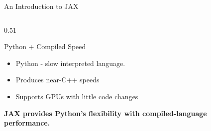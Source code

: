 \documentclass{beamer}
\begin{document}
\begin{frame}{An Introduction to JAX}
\begin{columns}[T,totalwidth=\textwidth]
\begin{column}{0.51\textwidth}
\begin{block}{Python + Compiled Speed}
\scriptsize
\begin{itemize}
    \item Python - slow interpreted language.
    \item Produces near-C++ speeds
    \item Supports GPUs with little code changes
\end{itemize}
\vspace{1.3em}
\textbf{JAX provides Python's flexibility with compiled-language performance.}
\end{block}
\end{column}
\end{columns}
\end{frame}
\end{document}
